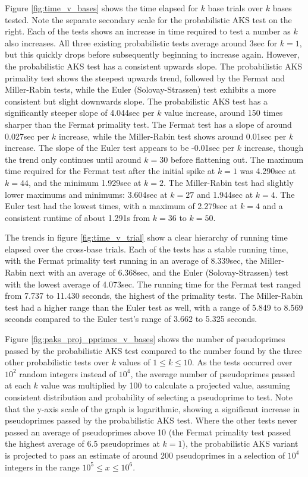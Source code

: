 \documentclass{article}
\begin{document}
Figure \ref{fig:time_v_bases} shows the time elapsed for $k$ base trials over $k$ bases tested. Note the separate secondary scale for the probabilistic AKS test on the right. Each of the tests shows an increase in time required to test a number as $k$ also increases. All three existing probabilistic tests average around 3sec for $k = 1$, but this quickly drops before subsequently beginning to increase again. However, the probabilistic AKS test has a consistent upwards slope. The probabilistic AKS primality test shows the steepest upwards trend, followed by the Fermat and Miller-Rabin tests, while the Euler (Solovay-Strassen) test exhibits a more consistent but slight downwards slope. The probabilistic AKS test has a significantly steeper slope of 4.044sec per $k$ value increase, around 150 times sharper than the Fermat primality test. The Fermat test has a slope of around 0.027sec per $k$ increase, while the Miller-Rabin test shows around 0.01sec per $k$ increase. The slope of the Euler test appears to be -0.01sec per $k$ increase, though the trend only continues until around $k=30$ before flattening out. The maximum time required for the Fermat test after the initial spike at $k=1$ was 4.290sec at $k=44$, and the minimum 1.929sec at $k=2$. The Miller-Rabin test had slightly lower maximums and minimums: 3.604sec at $k=27$ and 1.944sec at $k=4$. The Euler test had the lowest times, with a maximum of 2.279sec at $k=4$ and a consistent runtime of about 1.291s from $k=36$ to $k=50$.

The trends in figure \ref{fig:time_v_trial} show a clear hierarchy of running time elapsed over the cross-base trials. Each of the tests has a stable running time, with the Fermat primality test running in an average of 8.339sec, the Miller-Rabin next with an average of 6.368sec, and the Euler (Solovay-Strassen) test with the lowest average of 4.073sec. The running time for the Fermat test ranged from 7.737 to 11.430 seconds, the highest of the primality tests. The Miller-Rabin test had a higher range than the Euler test as well, with a range of 5.849 to 8.569 seconds compared to the Euler test's range of 3.662 to 5.325 seconds.

Figure \ref{fig:paks_proj_pprimes_v_bases} shows the number of pseudoprimes passed by the probabilistic AKS test compared to the number found by the three other probabilistic tests over $k$ values of $1 \leq k \leq 10$. As the tests occurred over $10^2$ random integers instead of $10^4$, the average number of pseudoprimes passed at each $k$ value was multiplied by 100 to calculate a projected value, assuming consistent distribution and probability of selecting a pseudoprime to test. Note that the y-axis scale of the graph is logarithmic, showing a significant increase in pseudoprimes passed by the probabilistic AKS test. Where the other tests never passed an average of pseudoprimes above 10 (the Fermat primality test passed the highest average of 6.5 pseudoprimes at $k=1$), the probabilistic AKS variant is projected to pass an estimate of around 200 pseudoprimes in a selection of $10^4$ integers in the range $10^5 \leq x \leq 10^6$.
\end{document}
